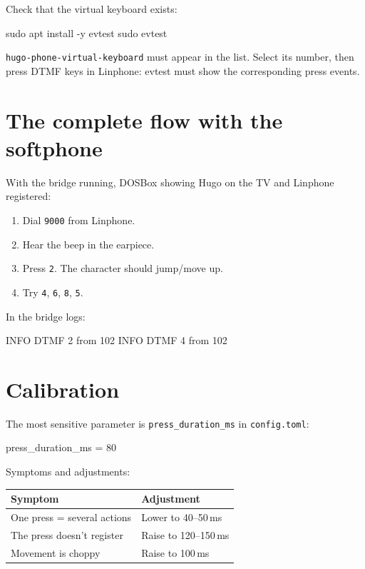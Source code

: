 Check that the virtual keyboard exists:

\begin{shellcode}
sudo apt install -y evtest
sudo evtest
\end{shellcode}

\texttt{hugo-phone-virtual-keyboard} must appear in the list. Select its number, then press DTMF keys in Linphone: evtest must show the corresponding press events.

\section{The complete flow with the softphone}

With the bridge running, DOSBox showing Hugo on the TV and Linphone registered:

\begin{enumerate}
  \item Dial \texttt{9000} from Linphone.
  \item Hear the beep in the earpiece.
  \item Press \texttt{2}. The character should jump/move up.
  \item Try \texttt{4}, \texttt{6}, \texttt{8}, \texttt{5}.
\end{enumerate}

In the bridge logs:

\begin{plaincode}
INFO DTMF 2 from 102
INFO DTMF 4 from 102
\end{plaincode}

\section{Calibration}

The most sensitive parameter is \texttt{press\_duration\_ms} in \texttt{config.toml}:

\begin{tomlcode}
[bridge]
press_duration_ms = 80
\end{tomlcode}

Symptoms and adjustments:

\begin{table}[h]
\centering
\begin{tabular}{ll}
\toprule
\textbf{Symptom} & \textbf{Adjustment} \\
\midrule
One press = several actions & Lower to 40--50\,ms \\
The press doesn't register & Raise to 120--150\,ms \\
Movement is choppy & Raise to 100\,ms \\
\bottomrule
\end{tabular}
\end{table}

